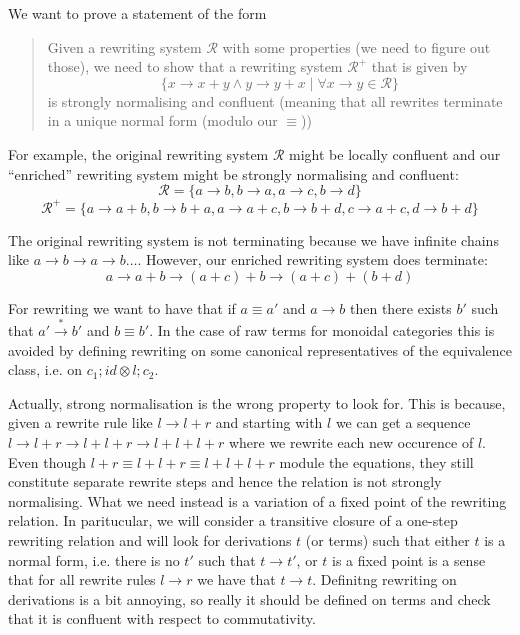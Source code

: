 \documentclass[acmsmall,screen, nonacm, anonymous]{acmart}
\begin{document}
We want to prove a statement of the form 
\begin{quotation}
  Given a rewriting system $\mathcal{R}$ with some properties (we need to figure out those), we need to show that a rewriting system $\mathcal{R}^{+}$ that is given by
  \[
  \{x \to x + y \land y \to y + x \;|\; \forall x \to y \in \mathcal{R}\}
  \]
  is strongly normalising and confluent (meaning that all rewrites terminate in a unique normal form (modulo our $\equiv$))
\end{quotation}

For example, the original rewriting system $\mathcal{R}$ might be locally confluent and our \enquote{enriched} rewriting system might be strongly normalising and confluent:
\[
\mathcal{R} = \{a \to b, b \to a, a \to c, b \to d\}
\]
\[
\mathcal{R}^{+} = \{a \to a + b, b \to b + a, a \to a + c, b \to b + d, c \to a + c, d \to b + d\}
\]

The original rewriting system is not terminating because we have infinite chains like $a \to b \to a \to b \ldots$.
However, our enriched rewriting system does terminate:
\[
a \to a + b \to (a + c) + b \to (a + c) + (b + d)
\]

For rewriting we want to have that if $a \equiv a'$ and $a \xrightarrow{} b$ then there exists $b'$ such that $a' \xrightarrow{*} b'$ and $b \equiv b'$.
In the case of raw terms for monoidal categories this is avoided by defining rewriting on some canonical representatives of the equivalence class, i.e. on $c_1;id \otimes l;c_2$.


Actually, strong normalisation is the wrong property to look for.
This is because, given a rewrite rule like $l \to l + r$ and starting with $l$ we can get a sequence $l \to l + r \to l + l + r \to l + l + l + r$ where we rewrite each new occurence of $l$.
Even though $l + r \equiv l + l + r \equiv l + l + l + r$ module the equations, they still constitute separate rewrite steps and hence the relation is not strongly normalising.
What we need instead is a variation of a fixed point of the rewriting relation.
In paritucular, we will consider a transitive closure of a one-step rewriting relation and will look for derivations $t$ (or terms) such that either $t$ is a normal form, i.e. there is no $t'$ such that $t \to t'$, or $t$ is a fixed point is a sense that for all rewrite rules $l \to r$ we have that $t \to t$.
Definitng rewriting on derivations is a bit annoying, so really it should be defined on terms and check that it is confluent with respect to commutativity.


\end{document}
